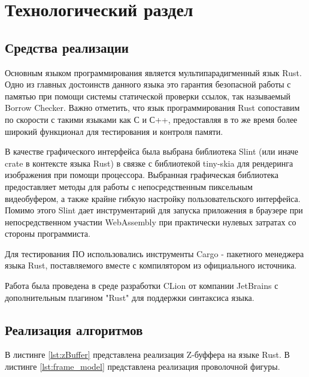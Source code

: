 \chapter{Технологический раздел}

\section{Средства реализации}

Основным языком программирования является мультипарадигменный язык Rust\cite{rust}.
Одно из главных достоинств данного языка это гарантия безопасной работы с памятью при помощи системы
статической проверки ссылок, так называемый Borrow Checker\cite{borrow-checker}.
Важно отметить, что язык программирования Rust сопоставим по скорости с такими языками как С и С++,
предоставляя в то же время более широкий функционал для тестирования и контроля памяти.

В качестве графического интерфейса была выбрана библиотека Slint\cite{slint}
(или иначе crate в контексте языка Rust) в связке с библиотекой tiny-skia\cite{tiny-skia}
для рендеринга изображения при помощи процессора.
Выбранная графическая библиотека предоставляет методы для работы с непосредственным пиксельным видеобуфером,
а также крайне гибкую настройку пользовательского интерфейса.
Помимо этого Slint дает инструментарий для запуска приложения в браузере при непосредственном участии WebAssembly
при практически нулевых затратах со стороны программиста.

Для тестирования ПО использовались инструменты Cargo\cite{cargo} - пакетного менеджера языка Rust,
поставляемого вместе с компилятором из официального источника.

Работа была проведена в среде разработки CLion\cite{clion} от компании JetBrains\cite{JB}
с дополнительным плагином "Rust" для поддержки синтаксиса языка.

\section{Реализация алгоритмов}

В листинге \ref{lst:zBuffer} представлена реализация Z-буффера на языке Rust.
В листинге \ref{lst:frame_model} представлена реализация проволочной фигуры.


